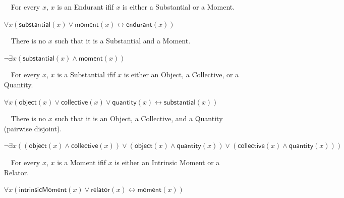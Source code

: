 \documentclass{article}
\newcommand{\AxLabel}{a}
\newcounter{cntax}
\newcommand{\myax}[1]{\refstepcounter{cntax}{\bf \small \AxLabel\thecntax}\label{#1}$\,\,\,\,$}
\newcommand{\me}[1]{\textsf{#1}}
\begin{document}
\begin{itemize}
    \item[\myax{ax_endurant_taxonomy}] For every $x$, $x$ is an \me{Endurant} ifif $x$ is either a \me{Substantial} or a \me{Moment}.
    
    $\forall x(\textsf{substantial}(x)\vee \textsf{moment}(x)\leftrightarrow \textsf{endurant}(x))$
    
    
    
    \item[\myax{ax_endurant_partition}] There is no $x$ such that it is a \me{Substantial} and a \me{Moment}.
    
    $\neg \exists x(\textsf{substantial}(x)\wedge \textsf{moment}(x))$
    
    
    
    \item[\myax{ax_substantial_taxonomy}] For every $x$, $x$ is a \me{Substantial} ifif $x$ is either an \me{Object}, a \me{Collective}, or a \me{Quantity}.
    
    $\forall x(\textsf{object}(x)\vee \textsf{collective}(x)\vee \textsf{quantity}(x)\leftrightarrow \textsf{substantial}(x))$
    
    
    
    \item[\myax{ax_substantial_partition}] There is no $x$ such that it is an \me{Object}, a \me{Collective}, and a \me{Quantity} (pairwise disjoint).
    
    $\neg \exists x((\textsf{object}(x)\wedge \textsf{collective}(x))\vee (\textsf{object}(x)\wedge \textsf{quantity}(x))\vee (\textsf{collective}(x)\wedge \textsf{quantity}(x)))$
    
    

    \item[\myax{ax_moment_taxonomy}] For every $x$, $x$ is a \me{Moment} ifif $x$ is either an \me{Intrinsic Moment} or a \me{Relator}.
    
    $\forall x(\textsf{intrinsicMoment}(x)\vee \textsf{relator}(x)\leftrightarrow \textsf{moment}(x))$
    
    
    

\end{itemize}
\end{document}
